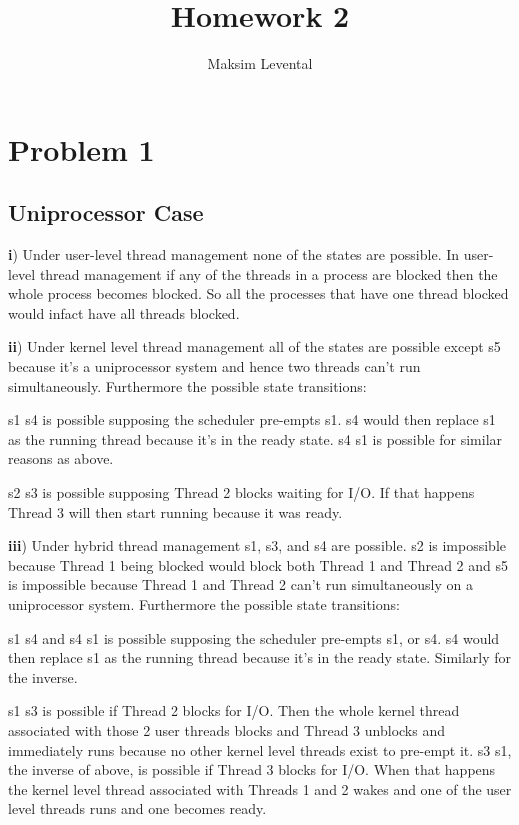 \documentclass[11pt]{article} %
\title{Homework 2}
\author{Maksim Levental}
\begin{document}
\maketitle

\section*{Problem 1}
\subsection*{Uniprocessor Case}

\textbf{i}) Under user-level thread management none of the states are possible. In user-level thread management if any of the threads in a process are blocked then the whole process becomes blocked. So all the processes that have one thread blocked would infact have all threads blocked. \bigskip

\noindent \textbf{ii}) Under kernel level thread management all of the states are possible except s5 because it's a uniprocessor system and hence two threads can't run simultaneously. Furthermore the possible state transitions:\bigskip

\noindent s1 \overrightarrow{} s4 is possible supposing the scheduler pre-empts s1. s4 would then replace s1 as the running thread because it's in the ready state.
s4  \overrightarrow{} s1 is possible for similar reasons as above.\bigskip

\noindent s2 \overrightarrow{} s3 is possible supposing Thread 2 blocks waiting for I/O. If that happens Thread 3 will then start running because it was ready.\bigskip

\noindent \textbf{iii}) Under hybrid thread management s1, s3, and s4 are possible. s2 is impossible because  Thread 1 being blocked would block both Thread 1 and Thread 2 and s5 is impossible because Thread 1 and Thread 2 can't run simultaneously on a uniprocessor system. Furthermore the possible state transitions:\bigskip

\noindent s1 \overrightarrow{} s4 and s4 \overrightarrow{} s1 is possible supposing the scheduler pre-empts s1, or s4. s4 would then replace s1 as the running thread because it's in the ready state. Similarly for the inverse.\bigskip

\noindent s1 \overrightarrow{} s3 is possible if Thread 2 blocks for I/O. Then the whole kernel thread associated with those 2 user threads blocks and Thread 3 unblocks and immediately runs because no other kernel level threads exist to pre-empt it. 
s3 \overrightarrow{} s1, the inverse of above, is possible if Thread 3 blocks for I/O.  When that happens the kernel level thread associated with Threads 1 and 2 wakes and one of the user level threads runs and one becomes ready.\bigskip
\end{document}
